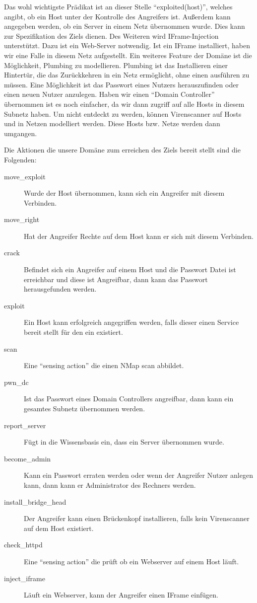 Das wohl wichtigste Prädikat ist an dieser Stelle \enquote{exploited(host)},
welches angibt, ob ein Host unter der Kontrolle des Angreifers
ist. Außerdem kann angegeben werden, ob ein Server in einem Netz
übernommen wurde. Dies kann zur Spezifikation des Ziels dienen. Des
Weiteren wird IFrame-Injection unterstützt. Dazu ist ein Web-Server
notwendig. Ist ein IFrame installiert, haben wir eine Falle
in diesem Netz aufgestellt. Ein weiteres Feature der Domäne ist die
Möglichkeit, Plumbing zu modellieren. Plumbing ist das Installieren
einer Hintertür, die das Zurückkehren in ein Netz ermöglicht, ohne
einen  ausführen zu müssen. Eine Möglichkeit ist das Passwort
eines Nutzers herauszufinden oder einen neuen Nutzer anzulegen. Haben
wir einen \enquote{Domain Controller} übernommen ist es noch einfacher, da wir
dann zugriff auf alle Hosts in diesem Subnetz haben. Um nicht
entdeckt zu werden, können Virenscanner auf Hosts und  in
Netzen modelliert werden. Diese Hosts bzw. Netze werden dann umgangen.

Die Aktionen die unsere Domäne zum erreichen des Ziels bereit stellt
sind die Folgenden:

\begin{description}
  \item[move\_exploit] Wurde der Host übernommen, kann sich ein Angreifer
      mit diesem Verbinden.
  \item[move\_right] Hat der Angreifer Rechte auf dem Host kann er sich mit
      diesem Verbinden.
  \item[crack] Befindet sich ein Angreifer auf einem Host und die Passwort
      Datei ist erreichbar und diese ist Angreifbar, dann kann das Passwort
      herausgefunden werden.
  \item[exploit] Ein Host kann erfolgreich angegriffen werden, falls dieser
      einen Service bereit stellt für den ein  existiert.
  \item[scan] Eine \enquote{sensing action} die einen NMap scan abbildet.
  \item[pwn\_dc] Ist das Passwort eines Domain Controllers angreifbar, dann
      kann ein gesamtes Subnetz übernommen werden.
  \item[report\_server] Fügt in die Wissensbasis ein, dass ein Server
      übernommen wurde.
  \item[become\_admin] Kann ein Passwort erraten werden oder wenn der Angreifer
      Nutzer anlegen kann, dann kann er Administrator des Rechners werden.
  \item[install\_bridge\_head] Der Angreifer kann einen Brückenkopf
      installieren, falls kein Virenscanner auf dem Host existiert.
  \item[check\_httpd] Eine \enquote{sensing action} die prüft ob ein Webserver
      auf einem Host läuft.
  \item[inject\_iframe] Läuft ein Webserver, kann der Angreifer einen IFrame
      einfügen.
\end{description}

